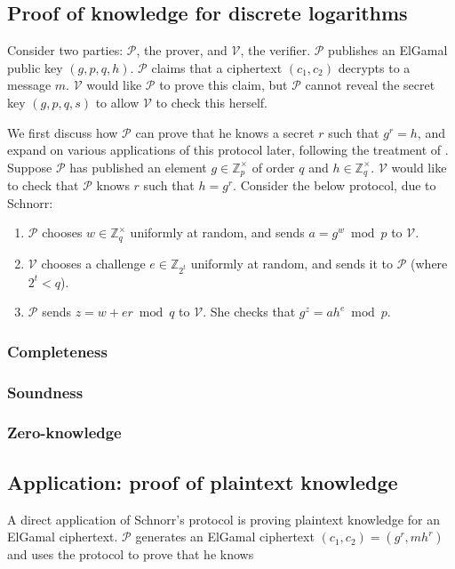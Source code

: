 \documentclass[11pt,twoside,a4paper]{article}
\theoremstyle{definition}
\begin{document}
\subsection{Proof of knowledge for discrete logarithms}
Consider two parties: \(\mathcal{P}\), the prover, and \(\mathcal{V}\), the verifier. \(\mathcal{P}\) publishes an ElGamal public key \((g,p,q,h)\). \(\mathcal{P}\) claims that a ciphertext \((c_1, c_2)\) decrypts to a message \(m\). \(\mathcal{V}\) would like \(\mathcal{P}\) to prove this claim, but \(\mathcal{P}\) cannot reveal the secret key \((g,p,q,s)\) to allow \(\mathcal{V}\) to check this herself.

We first discuss how \(\mathcal{P}\) can prove that he knows a secret \(r\) such that \(g^r=h\), and expand on various applications of this protocol later, following the treatment of \cite{damgaard2002sigma}. Suppose \(\mathcal{P}\) has published an element \(g\in\mathbb{Z}^\times_p\) of order \(q\) and \(h\in\mathbb{Z}^\times_q\). \(\mathcal{V}\) would like to check that \(\mathcal{P}\) knows \(r\) such that \(h=g^r\). Consider the below protocol, due to Schnorr:
\begin{enumerate}
    \item \(\mathcal{P}\) chooses \(w\in\mathbb{Z}^\times_q\) uniformly at random, and sends \(a=g^w\bmod p\) to \(\mathcal{V}\).
    \item \(\mathcal{V}\) chooses a challenge \(e\in\mathbb{Z}_{2^t}\) uniformly at random, and sends it to \(\mathcal{P}\) (where \(2^t<q\)).
    \item \(\mathcal{P}\) sends \(z=w+er\bmod q\) to \(\mathcal{V}\). She checks that \(g^z=ah^e\bmod p\).
\end{enumerate}
\subsubsection{Completeness}
\subsubsection{Soundness}
\subsubsection{Zero-knowledge}
\subsection{Application: proof of plaintext knowledge}
A direct application of Schnorr's protocol is proving plaintext knowledge for an ElGamal ciphertext. \(\mathcal{P}\) generates an ElGamal ciphertext \((c_1, c_2)=(g^r, mh^r)\) and uses the protocol to prove that he knows
\end{document}
